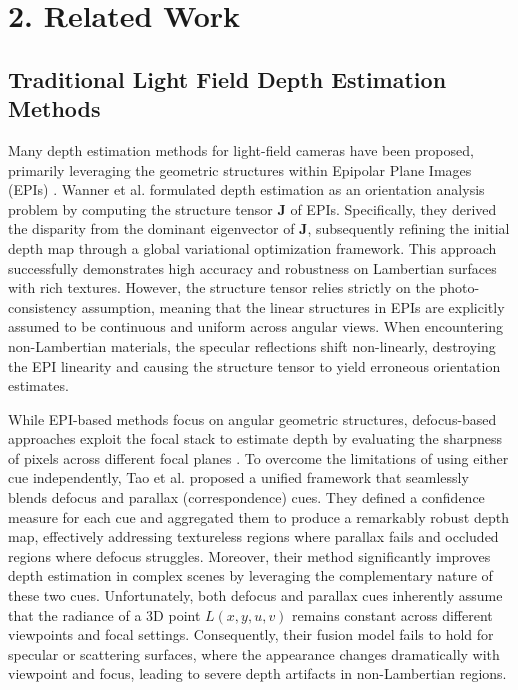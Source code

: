 \section{2. Related Work}

\subsection{Traditional Light Field Depth Estimation Methods}

Many depth estimation methods for light-field cameras have been proposed, primarily leveraging the geometric structures within Epipolar Plane Images (EPIs) \cite{EPIdepthestimationlightfie}. Wanner et al. \cite{WannerEPIstructuretensorgl} formulated depth estimation as an orientation analysis problem by computing the structure tensor $\mathbf{J}$ of EPIs. Specifically, they derived the disparity from the dominant eigenvector of $\mathbf{J}$, subsequently refining the initial depth map through a global variational optimization framework. This approach successfully demonstrates high accuracy and robustness on Lambertian surfaces with rich textures. However, the structure tensor relies strictly on the photo-consistency assumption, meaning that the linear structures in EPIs are explicitly assumed to be continuous and uniform across angular views. When encountering non-Lambertian materials, the specular reflections shift non-linearly, destroying the EPI linearity and causing the structure tensor to yield erroneous orientation estimates.

While EPI-based methods focus on angular geometric structures, defocus-based approaches exploit the focal stack to estimate depth by evaluating the sharpness of pixels across different focal planes \cite{defocusdepthestimationfocal}. To overcome the limitations of using either cue independently, Tao et al. \cite{Taodefocusparallaxfusionli} proposed a unified framework that seamlessly blends defocus and parallax (correspondence) cues. They defined a confidence measure for each cue and aggregated them to produce a remarkably robust depth map, effectively addressing textureless regions where parallax fails and occluded regions where defocus struggles. Moreover, their method significantly improves depth estimation in complex scenes by leveraging the complementary nature of these two cues. Unfortunately, both defocus and parallax cues inherently assume that the radiance of a 3D point $L(x,y,u,v)$ remains constant across different viewpoints and focal settings. Consequently, their fusion model fails to hold for specular or scattering surfaces, where the appearance changes dramatically with viewpoint and focus, leading to severe depth artifacts in non-Lambertian regions.

